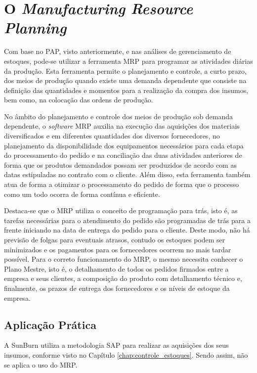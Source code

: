 \chapter{O \textit{Manufacturing Resource Planning}}
\label{chap:manufacturing_resource_planning}

Com base no \ac{PAP}, visto anteriormente, e nas análises de gerenciamento de estoques, pode-se utilizar a ferramenta \ac{MRP} para programar as atividades diárias da produção. Esta ferramenta permite o planejamento e controle, a curto prazo, dos meios de produção quando existe uma demanda dependente que consiste na definição das quantidades e momentos para a realização da compra dos insumos, bem como, na colocação das ordens de produção.

No âmbito do planejamento e controle dos meios de produção sob demanda dependente, o \textit{software} \ac{MRP} auxilia na execução das aquisições dos materiais diversificados e em diferentes quantidades dos diversos fornecedores, no planejamento da disponibilidade dos equipamentos necessários para cada etapa do processamento do pedido e na conciliação das duas atividades anteriores de forma que os produtos demandados possam ser produzidos de acordo com as datas estipuladas no contrato com o cliente. Além disso, esta ferramenta também atua de forma a otimizar o processamento do pedido de forma que o processo como um todo ocorra de forma contínua e eficiente.

Destaca-se que o \ac{MRP} utiliza o conceito de programação para trás, isto é, as tarefas necessárias para o atendimento do pedido são programadas de trás para a frente iniciando na data de entrega do pedido para o cliente. Deste modo, não há previsão de folgas para eventuais atrasos, contudo os estoques podem ser minimizados e os pagamentos para os fornecedores ocorrem no mais tardar possível. Para o correto funcionamento do \ac{MRP}, o mesmo necessita conhecer o Plano Mestre, isto é, o detalhamento de todos os pedidos firmados entre a empresa e seus clientes, a composição do produto com detalhamento técnico e, finalmente, os prazos de entrega dos fornecedores e os níveis de estoque da empresa.


\section{Aplicação Prática}
\label{sec:manufacturing_resource_planning_aplicacao}
A SunBurn utiliza a metodologia \ac{SAP} para realizar as aquisições dos seus insumos, conforme visto no Capítulo \ref{chap:controle_estoques}. Sendo assim, não se aplica o uso do \ac{MRP}. 
